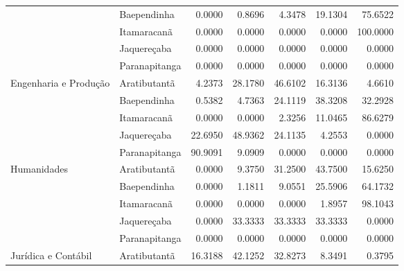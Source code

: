 \begin{table}[ht]
\begin{tabular}{ll rrrrr}
                          & Baependinha             &             0.0000 &       0.8696 &      4.3478 &    19.1304 &          75.6522 \\ 
                          & Itamaracanã             &             0.0000 &       0.0000 &      0.0000 &     0.0000 &         100.0000 \\ 
                          & Jaquereçaba             &             0.0000 &       0.0000 &      0.0000 &     0.0000 &           0.0000 \\ 
                          & Paranapitanga           &             0.0000 &       0.0000 &      0.0000 &     0.0000 &           0.0000 \\ 
  Engenharia e Produção   & Aratibutantã            &             4.2373 &      28.1780 &     46.6102 &    16.3136 &           4.6610 \\ 
                          & Baependinha             &             0.5382 &       4.7363 &     24.1119 &    38.3208 &          32.2928 \\ 
                          & Itamaracanã             &             0.0000 &       0.0000 &      2.3256 &    11.0465 &          86.6279 \\ 
                          & Jaquereçaba             &            22.6950 &      48.9362 &     24.1135 &     4.2553 &           0.0000 \\ 
                          & Paranapitanga           &            90.9091 &       9.0909 &      0.0000 &     0.0000 &           0.0000 \\ 
  Humanidades             & Aratibutantã            &             0.0000 &       9.3750 &     31.2500 &    43.7500 &          15.6250 \\ 
                          & Baependinha             &             0.0000 &       1.1811 &      9.0551 &    25.5906 &          64.1732 \\ 
                          & Itamaracanã             &             0.0000 &       0.0000 &      0.0000 &     1.8957 &          98.1043 \\ 
                          & Jaquereçaba             &             0.0000 &      33.3333 &     33.3333 &    33.3333 &           0.0000 \\ 
                          & Paranapitanga           &             0.0000 &       0.0000 &      0.0000 &     0.0000 &           0.0000 \\ 
  Jurídica e Contábil     & Aratibutantã            &            16.3188 &      42.1252 &     32.8273 &     8.3491 &           0.3795 \\ 

\end{tabular}
\end{table}
